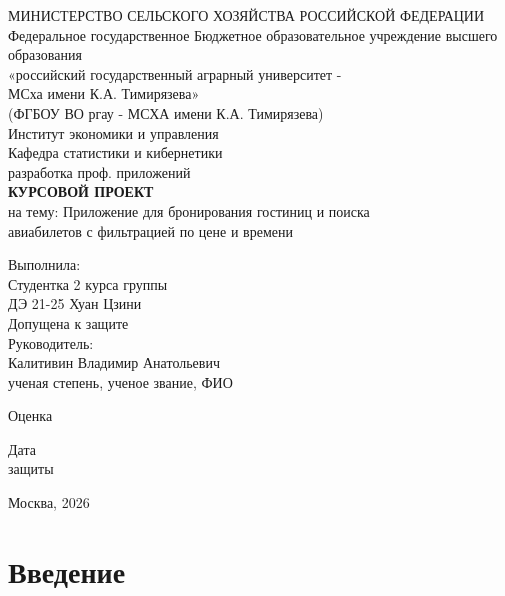 \documentclass[14pt,a4paper,oneside]{extreport}
\begin{document}
\pagestyle{plain}

\begin{titlepage}
\centering
\fontsize{11}{14}\selectfont
МИНИСТЕРСТВО СЕЛЬСКОГО ХОЗЯЙСТВА РОССИЙСКОЙ ФЕДЕРАЦИИ\\
Федеральное государственное Бюджетное образовательное учреждение высшего образования\\
«российский государственный аграрный университет -\\
МСха имени К.А. Тимирязева»\\
(ФГБОУ ВО ргау - МСХА имени К.А. Тимирязева)\\[1.0cm]
{\large Институт экономики и управления\\
Кафедра статистики и кибернетики}\\[0.9cm]
разработка проф. приложений\\[0.9cm]
{\Large\bfseries КУРСОВОЙ ПРОЕКТ}\\[0.4cm]
на тему: Приложение для бронирования гостиниц и поиска\\
авиабилетов с фильтрацией по цене и времени\\[0.9cm]
\begin{flushright}
Выполнила:\\
Студентка 2 курса группы\\
ДЭ 21-25 Хуан Цзини\\
Допущена к защите\\
Руководитель:\\
Калитивин Владимир Анатольевич\\
{\footnotesize ученая степень, ученое звание, ФИО}
\end{flushright}
\vspace{0.8cm}
Оценка \underline{\hspace{6cm}}\\[0.8cm]
\begin{flushright}
Дата \underline{\hspace{3.5cm}}\\
защиты \underline{\hspace{3.5cm}}
\end{flushright}
\vspace{1.0cm}
Москва, 2026
\end{titlepage}
\newpage
\tableofcontents
\newpage
\setcounter{page}{3}


\chapter*{Введение}
\end{document}
